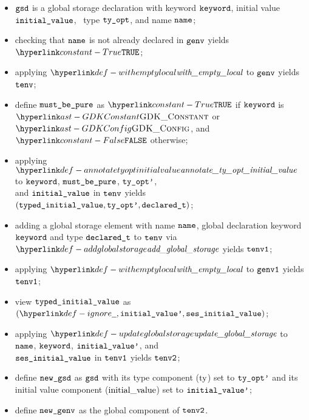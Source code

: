 \ProseParagraph
\AllApply
\begin{itemize}
  \item $\texttt{gsd}$ is a global storage declaration with keyword $\texttt{keyword}$, initial value \\ $\texttt{initial\_value}$,
        \optionalterm\ type $\texttt{ty\_opt}$, and name $\texttt{name}$;
  \item checking that $\texttt{name}$ is not already declared in $\texttt{genv}$ yields $\True$\ProseOrTypeError;
  \item applying $\withemptylocal$ to $\texttt{genv}$ yields $\texttt{tenv}$;
  \item define $\texttt{must\_be\_pure}$ as $\True$ if $\texttt{keyword}$ is $\GDKConstant$ or $\GDKConfig$, and $\False$ otherwise;
  \item applying $\annotatetyoptinitialvalue$ to $\texttt{keyword}$, $\texttt{must\_be\_pure}$, $\texttt{ty\_opt'}$, \\
        and $\texttt{initial\_value}$ in $\texttt{tenv}$ yields\\
        $(\texttt{typed\_initial\_value}, \texttt{ty\_opt'}, \texttt{declared\_t})$\ProseOrTypeError;
  \item adding a global storage element with name $\texttt{name}$, global declaration keyword \\ $\texttt{keyword}$ and type $\texttt{declared\_t}$
        to $\texttt{tenv}$ via $\addglobalstorage$ yields $\texttt{tenv1}$\ProseOrTypeError;
  \item applying $\withemptylocal$ to $\texttt{genv1}$ yields $\texttt{tenv1}$;
  \item view $\texttt{typed\_initial\_value}$ as $(\Ignore, \initialvaluep, \vsesinitialvalue)$;
  \item applying $\updateglobalstorage$ to $\texttt{name}$, $\texttt{keyword}$, $\texttt{initial\_value'}$, and \\
        $\texttt{ses\_initial\_value}$ in $\texttt{tenv1}$ yields $\texttt{tenv2}$\ProseOrTypeError;
  \item define $\texttt{new\_gsd}$ as $\texttt{gsd}$ with its type component ($\text{ty}$) set to $\texttt{ty\_opt'}$ and its initial value component
        ($\text{initial\_value}$) set to $\texttt{initial\_value'}$;
  \item define $\texttt{new\_genv}$ as the global component of $\texttt{tenv2}$.
\end{itemize}

